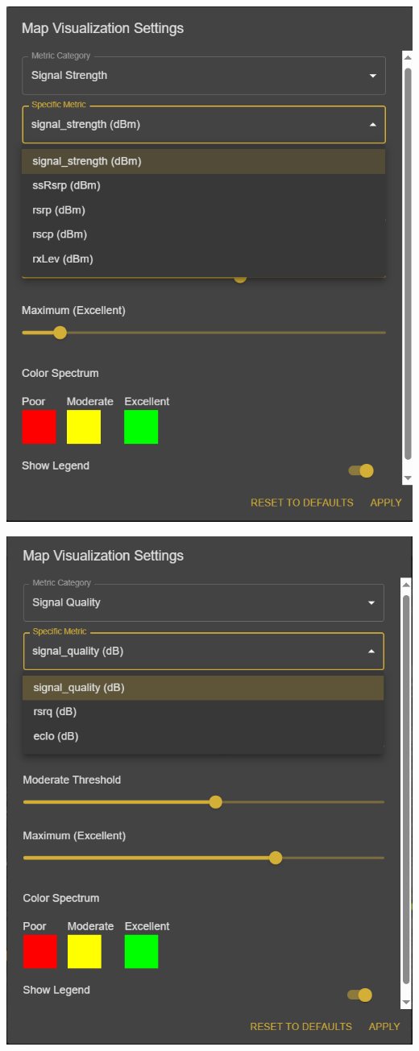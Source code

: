 \begin{itemize}
\begin{center}
        \includegraphics[width=\textwidth]{images/setting_signal_strength_metrics.png}
    \end{center}
    \begin{center}
        \includegraphics[width=\textwidth]{images/setting_signal_quality_metrics.png}

\end{center}
\end{itemize}
